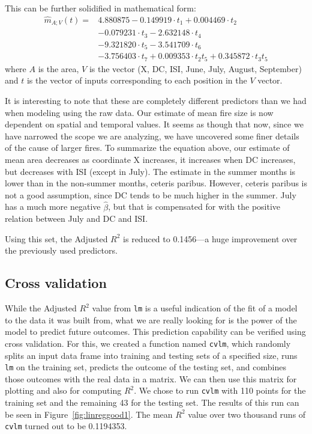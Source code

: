 \documentclass{article}
\begin{document}
This can be further solidified in mathematical form:
\begin{align*}
  \widehat{m}_{A;V}(t) = &4.880875 - 0.149919 \cdot t_1 + 0.004469 \cdot t_2 \\
                         &- 0.079231 \cdot t_3 - 2.632148 \cdot t_4 \\
                         &- 9.321820 \cdot t_5 - 3.541709\cdot t_6 \\
                         &- 3.756403\cdot t_7 + 0.009353\cdot t_2 t_5 
                         + 0.345872\cdot t_3 t_5
\end{align*}
where $A$ is the area, $V$ is the vector (X, DC, ISI, June, July, August, 
September) and $t$ is the vector of inputs corresponding to each position in 
the $V$ vector.

It is interesting to note that these are completely different predictors than
we had when modeling using the raw data. Our estimate of mean fire size is now
dependent on spatial and temporal values. It seems as though that now, since we
have narrowed the scope we are analyzing, we have uncovered some finer details
of the cause of larger fires. To summarize the equation above, our estimate of
mean area decreases as coordinate X increases, it increases when DC increases,
but decreases with ISI (except in July). The estimate in the summer months is
lower than in the non-summer months, ceteris paribus. However, ceteris paribus
is not a good assumption, since DC tends to be much higher in the summer. July
has a much more negative $\hat{\beta}$, but that is compensated for with the
positive relation between July and DC and ISI.

Using this set, the Adjusted $R^2$ is reduced to 0.1456---a huge improvement
over the previously used predictors.

\subsection{Cross validation}

While the Adjusted $R^2$ value from \verb=lm= is a useful indication of the fit
of a model to the data it was built from, what we are really looking for is the
power of the model to predict future outcomes. This prediction capability can
be verified using cross validation. For this, we created a function named
\verb=cvlm=, which randomly splits an input data frame into training and
testing sets of a specified size, runs \verb=lm= on the training set, predicts
the outcome of the testing set, and combines those outcomes with the real data
in a matrix. We can then use this matrix for plotting and also for computing
$R^2$. We chose to run \verb=cvlm= with 110 points for the training set and the
remaining 43 for the testing set. The results of this run can be seen in
Figure~\ref{fig:linreggood1}. The mean $R^2$ value over two thousand runs of
\verb=cvlm= turned out to be 0.1194353.
\end{document}
